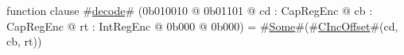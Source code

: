 function clause #\hyperref[sailMIPSzdecode]{decode}# (0b010010 @ 0b01101 @ cd : CapRegEnc @ cb : CapRegEnc @ rt : IntRegEnc @ 0b000 @ 0b000) = #\hyperref[sailMIPSzSome]{Some}#(#\hyperref[sailMIPSzCIncOffset]{CIncOffset}#(cd, cb, rt))
